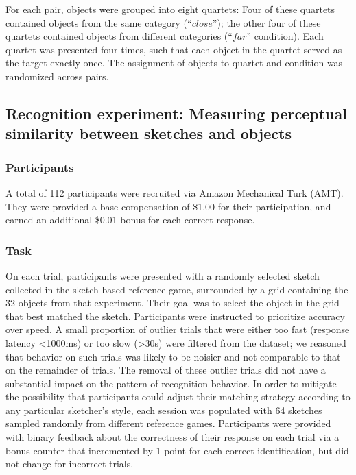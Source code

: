 \documentclass[9pt,twocolumn,twoside]{pnas-new}
\newcommand{\mwu}[1]{{\color{green}{[mwu: #1]}}}
\begin{document}
{For each pair, objects were grouped into eight quartets: Four of these quartets contained objects from the same category (``$close$''); the other four of these quartets contained objects from different categories (``$far$'' condition). \mwu{show picture of each condition?} Each quartet was presented four times, such that each object in the quartet served as the target exactly once. The assignment of objects to quartet and condition was randomized across pairs.

\subsection*{Recognition experiment: Measuring perceptual similarity between sketches and objects}

\subsubsection*{Participants}

A total of 112 participants were recruited via Amazon Mechanical Turk (AMT). They were provided a base compensation of \$1.00 for their participation, and earned an additional \$0.01 bonus for each correct response.

\subsubsection*{Task}

On each trial, participants were presented with a randomly selected sketch collected in the sketch-based reference game, surrounded by a grid containing the 32 objects from that experiment. Their goal was to select the object in the grid that best matched the sketch. Participants were instructed to prioritize accuracy over speed. A small proportion of outlier trials that were either too fast (response latency <1000ms) or too slow (>30s) were filtered from the dataset; we reasoned that behavior on such trials was likely to be noisier and not comparable to that on the remainder of trials.\mwu{is this kosher?} The removal of these outlier trials did not have a substantial impact on the pattern of recognition behavior. In order to mitigate the possibility that participants could adjust their matching strategy according to any particular sketcher's style, each session was populated with 64 sketches sampled randomly from different reference games. Participants were provided with binary feedback about the correctness of their response on each trial via a bonus counter that incremented by 1 point for each correct identification, but did not change for incorrect trials.

}
\end{document}
